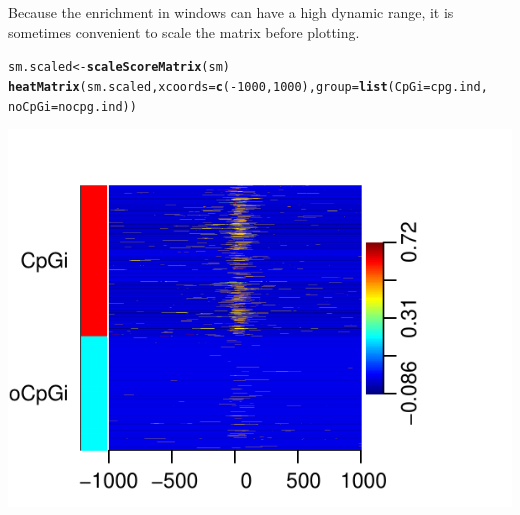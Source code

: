 \documentclass{article}\usepackage[]{graphicx}\usepackage[]{color}
\makeatletter
\newcommand{\hlnum}[1]{\textcolor[rgb]{0.686,0.059,0.569}{#1}}%
\newcommand{\hlopt}[1]{\textcolor[rgb]{0,0,0}{#1}}%
\newcommand{\hlstd}[1]{\textcolor[rgb]{0.345,0.345,0.345}{#1}}%
\newcommand{\hlkwb}[1]{\textcolor[rgb]{0.69,0.353,0.396}{#1}}%
\newcommand{\hlkwc}[1]{\textcolor[rgb]{0.333,0.667,0.333}{#1}}%
\newcommand{\hlkwd}[1]{\textcolor[rgb]{0.737,0.353,0.396}{\textbf{#1}}}%
\newenvironment{kframe}{%
 \def\at@end@of@kframe{}%
 \ifinner\ifhmode%
  \def\at@end@of@kframe{\end{minipage}}%
  \begin{minipage}{\columnwidth}%
 \fi\fi%
 \def\FrameCommand##1{\hskip\@totalleftmargin \hskip-\fboxsep
 \colorbox{shadecolor}{##1}\hskip-\fboxsep
     \hskip-\linewidth \hskip-\@totalleftmargin \hskip\columnwidth}%
 \MakeFramed {\advance\hsize-\width
   \@totalleftmargin\z@ \linewidth\hsize
   \@setminipage}}%
 {\par\unskip\endMakeFramed%
 \at@end@of@kframe}
\newenvironment{knitrout}{}{} %
\makeatother
\begin{document}
Because the enrichment in windows can have a high dynamic range, it is sometimes
convenient to scale the matrix before plotting.
\begin{knitrout}
\color{fgcolor}\begin{kframe}
\begin{alltt}
\hlstd{sm.scaled} \hlkwb{<-} \hlkwd{scaleScoreMatrix}\hlstd{(sm)}
\hlkwd{heatMatrix}\hlstd{(sm.scaled,} \hlkwc{xcoords} \hlstd{=} \hlkwd{c}\hlstd{(}\hlopt{-}\hlnum{1000}\hlstd{,} \hlnum{1000}\hlstd{),} \hlkwc{group} \hlstd{=} \hlkwd{list}\hlstd{(}\hlkwc{CpGi} \hlstd{= cpg.ind,}
    \hlkwc{noCpGi} \hlstd{= nocpg.ind))}
\end{alltt}
\end{kframe}

{\centering \includegraphics[width=.49\linewidth]{inst/doc/FiguresheatMatrixScales} 

}



\end{knitrout}
\end{document}
